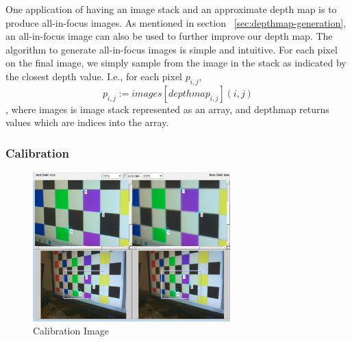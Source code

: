 \documentclass[annual, 12pt]{acmsiggraph}
\begin{document}
One application of having an image stack and an approximate depth map is to produce all-in-focus images.  As mentioned in section ~\ref{sec:depthmap-generation}, an all-in-focus image can also be used to further improve our depth map.  The algorithm to generate all-in-focus images is simple and intuitive.  For each pixel on the final image, we simply sample from the image in the stack as indicated by the closest depth value. I.e., for each pixel $p_{i,j}$, 
\begin{equation} 
p_{i,j} := images[ depthmap_{i,j} ](i,j)
\end{equation}, where images is image stack represented as an array, and depthmap returns values which are indices into the array.  
\subsubsection{Calibration}

\begin{figure}
\centering
\includegraphics[width=3in]{images/calibration.jpg}
\caption{Calibration Image}
\label{fig:calibration}
\end{figure}
\end{document}
